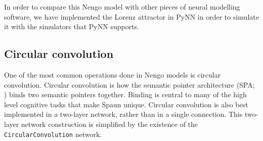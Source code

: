 \documentclass{frontiersSCNS}
\begin{document}
In order to compare this Nengo model
with other pieces of neural modelling software,
we have implemented the Lorenz attractor
in PyNN \cite{TODO} in order to simulate it
with the simulators that PyNN supports.

\subsection{Circular convolution} \label{sec:cconv}

One of the most common operations done
in Nengo models is circular convolution.
Circular convolution is how
the semantic pointer architecture
(SPA; \cite{TODO})
binds two semantic pointers together.
Binding is central to many
of the high level cognitive tasks
that make Spaun unique.
Circular convolution
is also best implemented in a two-layer network,
rather than in a single connection.
This two-layer network construction is simplified
by the existence of the \texttt{CircularConvolution} network.
\end{document}

